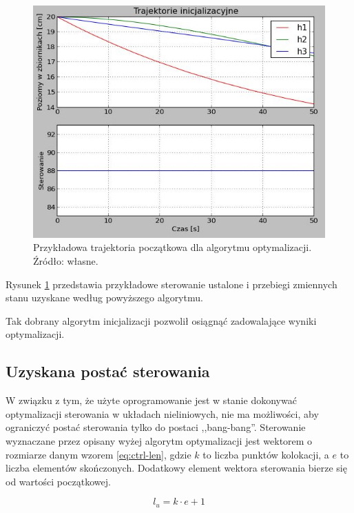 \begin{figure}[ht]
    \centering
    \includegraphics[scale=0.9]{Grafika/initial_guess}
    \caption{Przykładowa trajektoria początkowa dla algorytmu optymalizacji. Źródło: własne.}
    \label{fig:initialguess}
\end{figure}

Rysunek \ref{fig:initialguess} przedstawia przykładowe sterowanie ustalone i przebiegi zmiennych stanu uzyskane według powyższego algorytmu.

Tak dobrany algorytm inicjalizacji pozwolił osiągnąć zadowalające wyniki optymalizacji.


\subsection{Uzyskana postać sterowania}
\label{sub:opt-ctrl-form}

W związku z tym, że użyte oprogramowanie jest w stanie dokonywać optymalizacji sterowania w układach nieliniowych, nie ma możliwości, aby ograniczyć postać sterowania tylko do postaci ,,bang-bang''. Sterowanie wyznaczane przez opisany wyżej algorytm optymalizacji jest wektorem o rozmiarze danym wzorem \ref{eq:ctrl-len}, gdzie $k$ to liczba punktów kolokacji, a $e$ to liczba elementów skończonych. Dodatkowy element wektora sterowania bierze się od wartości początkowej.

\begin{equation}\label{eq:ctrl-len}
l_{u} = k \cdot e + 1
\end{equation}

